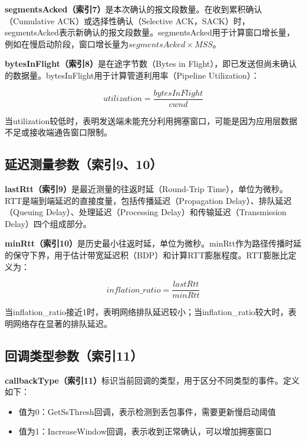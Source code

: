 \textbf{segmentsAcked（索引7）}是本次确认的报文段数量。在收到累积确认（Cumulative ACK）或选择性确认（Selective ACK，SACK）时，segmentsAcked表示新确认的报文段数量。segmentsAcked用于计算窗口增长量，例如在慢启动阶段，窗口增长量为$segmentsAcked \times MSS$。

\textbf{bytesInFlight（索引8）}是在途字节数（Bytes in Flight），即已发送但尚未确认的数据量。bytesInFlight用于计算管道利用率（Pipeline Utilization）：

\begin{equation}
utilization = \frac{bytesInFlight}{cwnd}
\end{equation}

当utilization较低时，表明发送端未能充分利用拥塞窗口，可能是因为应用层数据不足或接收端通告窗口限制。

\subsection{延迟测量参数（索引9、10）}

\textbf{lastRtt（索引9）}是最近测量的往返时延（Round-Trip Time），单位为微秒。RTT是端到端延迟的直接度量，包括传播延迟（Propagation Delay）、排队延迟（Queuing Delay）、处理延迟（Processing Delay）和传输延迟（Transmission Delay）四个组成部分。

\textbf{minRtt（索引10）}是历史最小往返时延，单位为微秒。minRtt作为路径传播时延的保守下界，用于估计带宽延迟积（BDP）和计算RTT膨胀程度。RTT膨胀比定义为：

\begin{equation}
inflation\_ratio = \frac{lastRtt}{minRtt}
\end{equation}

当inflation\_ratio接近1时，表明网络排队延迟较小；当inflation\_ratio较大时，表明网络存在显著的排队延迟。

\subsection{回调类型参数（索引11）}

\textbf{callbackType（索引11）}标识当前回调的类型，用于区分不同类型的事件。定义如下：

\begin{itemize}
    \item 值为0：GetSsThresh回调，表示检测到丢包事件，需要更新慢启动阈值
    \item 值为1：IncreaseWindow回调，表示收到正常确认，可以增加拥塞窗口
\end{itemize}

